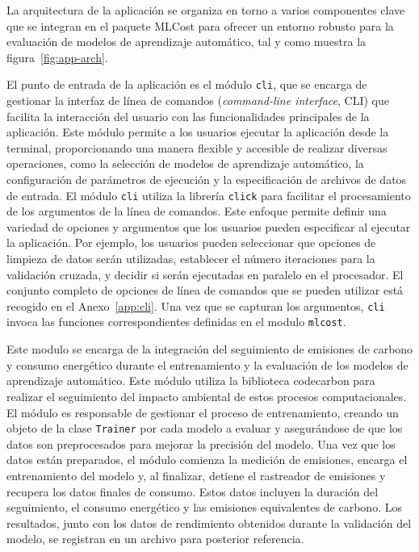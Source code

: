 La arquitectura de la aplicación se organiza en torno a varios componentes clave que se integran en el paquete MLCost para ofrecer un entorno robusto para la evaluación de modelos de aprendizaje automático, tal y como muestra la figura~\ref{fig:app-arch}.

El punto de entrada de la aplicación es el módulo \texttt{cli}, que se encarga de gestionar la interfaz de línea de comandos (\emph{command-line interface}, CLI) que facilita la interacción del usuario con las funcionalidades principales de la aplicación. Este módulo permite a los usuarios ejecutar la aplicación desde la terminal, proporcionando una manera flexible y accesible de realizar diversas operaciones, como la selección de modelos de aprendizaje automático, la configuración de parámetros de ejecución y la especificación de archivos de datos de entrada. El módulo \texttt{cli} utiliza la librería \texttt{click} para facilitar el procesamiento de los argumentos de la línea de comandos. Este enfoque permite definir una variedad de opciones y argumentos que los usuarios pueden especificar al ejecutar la aplicación. Por ejemplo, los usuarios pueden seleccionar que opciones de limpieza de datos serán utilizadas, establecer el número iteraciones para la validación cruzada, y decidir si serán ejecutadas en paralelo en el procesador. El conjunto completo de opciones de línea de comandos que se pueden utilizar está recogido en el Anexo~\ref{app:cli}. Una vez que se capturan los argumentos, \texttt{cli} invoca las funciones correspondientes definidas en el modulo \texttt{mlcost}.

Este modulo se encarga de la integración del seguimiento de emisiones de carbono y consumo energético durante el entrenamiento y la evaluación de los modelos de aprendizaje automático. Este módulo utiliza la biblioteca codecarbon para realizar el seguimiento del impacto ambiental de estos procesos computacionales. El módulo es responsable de gestionar el proceso de entrenamiento, creando un objeto de la clase \texttt{Trainer} por cada modelo a evaluar y asegurándose de que los datos son preprocesados para mejorar la precisión del modelo. Una vez que los datos están preparados, el módulo comienza la medición de emisiones, encarga el entrenamiento del modelo y, al finalizar, detiene el rastreador de emisiones y recupera los datos finales de consumo. Estos datos incluyen la duración del seguimiento, el consumo energético y las emisiones equivalentes de carbono. Los resultados, junto con los datos de rendimiento obtenidos durante la validación del modelo, se registran en un archivo para posterior referencia.

